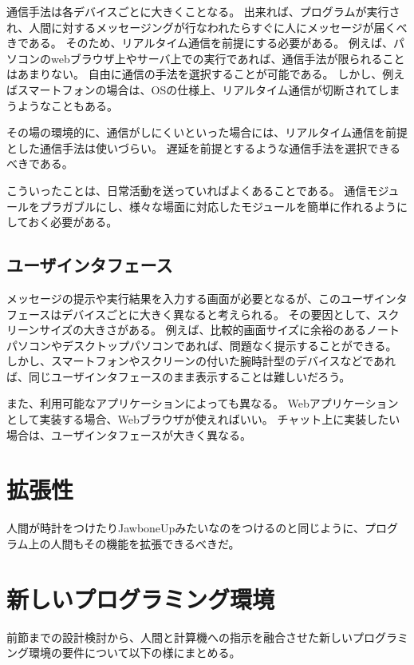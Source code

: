 通信手法は各デバイスごとに大きくことなる。
出来れば、プログラムが実行され、人間に対するメッセージングが行なわれたらすぐに人にメッセージが届くべきである。
そのため、リアルタイム通信を前提にする必要がある。
例えば、パソコンのwebブラウザ上やサーバ上での実行であれば、通信手法が限られることはあまりない。
自由に通信の手法を選択することが可能である。
しかし、例えばスマートフォンの場合は、OSの仕様上、リアルタイム通信が切断されてしまうようなこともある。

その場の環境的に、通信がしにくいといった場合には、リアルタイム通信を前提とした通信手法は使いづらい。
遅延を前提とするような通信手法を選択できるべきである。

こういったことは、日常活動を送っていればよくあることである。
通信モジュールをプラガブルにし、様々な場面に対応したモジュールを簡単に作れるようにしておく必要がある。

\subsection{ユーザインタフェース}\label{ux30e6ux30fcux30b6ux30a4ux30f3ux30bfux30d5ux30a7ux30fcux30b9}

メッセージの提示や実行結果を入力する画面が必要となるが、このユーザインタフェースはデバイスごとに大きく異なると考えられる。
その要因として、スクリーンサイズの大きさがある。
例えば、比較的画面サイズに余裕のあるノートパソコンやデスクトップパソコンであれば、問題なく提示することができる。
しかし、スマートフォンやスクリーンの付いた腕時計型のデバイスなどであれば、同じユーザインタフェースのまま表示することは難しいだろう。

また、利用可能なアプリケーションによっても異なる。
Webアプリケーションとして実装する場合、Webブラウザが使えればいい。
チャット上に実装したい場合は、ユーザインタフェースが大きく異なる。

\section{拡張性}\label{ux62e1ux5f35ux6027}

人間が時計をつけたりJawboneUpみたいなのをつけるのと同じように、プログラム上の人間もその機能を拡張できるべきだ。

\section{新しいプログラミング環境}\label{ux65b0ux3057ux3044ux30d7ux30edux30b0ux30e9ux30dfux30f3ux30b0ux74b0ux5883}

前節までの設計検討から、人間と計算機への指示を融合させた新しいプログラミング環境の要件について以下の様にまとめる。


